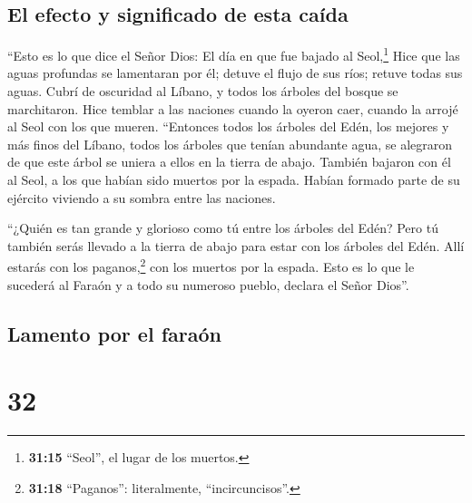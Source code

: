 \hypertarget{el-efecto-y-significado-de-esta-cauxedda}{%
\subsection{El efecto y significado de esta
caída}\label{el-efecto-y-significado-de-esta-cauxedda}}

 ``Esto es lo que dice el Señor Dios: El día en que fue
bajado al Seol,\footnote{\textbf{31:15} ``Seol'', el lugar de los
  muertos.} Hice que las aguas profundas se lamentaran por él; detuve el
flujo de sus ríos; retuve todas sus aguas. Cubrí de oscuridad al Líbano,
y todos los árboles del bosque se marchitaron.  Hice
temblar a las naciones cuando la oyeron caer, cuando la arrojé al Seol
con los que mueren. ``Entonces todos los árboles del Edén, los mejores y
más finos del Líbano, todos los árboles que tenían abundante agua, se
alegraron de que este árbol se uniera a ellos en la tierra de abajo.
 También bajaron con él al Seol, a los que habían sido
muertos por la espada. Habían formado parte de su ejército viviendo a su
sombra entre las naciones.

 ``¿Quién es tan grande y glorioso como tú entre los
árboles del Edén? Pero tú también serás llevado a la tierra de abajo
para estar con los árboles del Edén. Allí estarás con los
paganos,\footnote{\textbf{31:18} ``Paganos'': literalmente,
  ``incircuncisos''.} con los muertos por la espada. Esto es lo que le
sucederá al Faraón y a todo su numeroso pueblo, declara el Señor Dios''.

\hypertarget{lamento-por-el-farauxf3n}{%
\subsection{Lamento por el faraón}\label{lamento-por-el-farauxf3n}}

\hypertarget{section-31}{%
\section{32}\label{section-31}}

